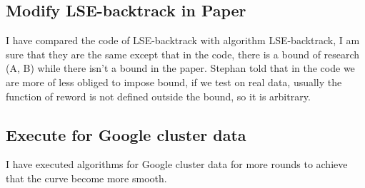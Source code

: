 \subsection*{Modify LSE-backtrack in Paper}
I have compared the code of LSE-backtrack with algorithm LSE-backtrack, I am sure that they are the same except that in the code, there is a bound of research (A, B) while there isn't a bound in the paper. Stephan told that in the code we are more of less obliged to impose bound, if we test on real data, usually the function of reword is not defined outside the bound, so it is arbitrary.


\subsection*{Execute for Google cluster data}
I have executed algorithms for Google cluster data for more rounds to achieve that the curve become more smooth.